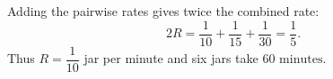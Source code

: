 Adding the pairwise rates gives twice the combined rate:
\[2R=\dfrac{1}{10}+\dfrac{1}{15}+\dfrac{1}{30}=\dfrac{1}{5}.\]
Thus $R=\dfrac{1}{10}$ jar per minute and six jars take $\boxed{60\text{ minutes}}$.
